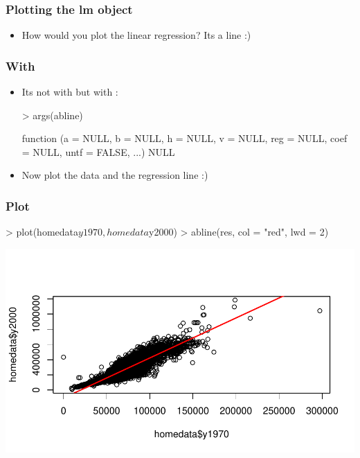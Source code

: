 \begin{frame}[allowframebreaks]
  \frametitle{Plotting the lm object}
  \begin{itemize}
  \item How would you plot the linear regression? Its a line :)
  \end{itemize}
\end{frame}

\begin{frame}
  \frametitle{With }
  \begin{itemize}
  \item Its not with  but with : \scriptsize
\begin{Schunk}
\begin{Sinput}
> args(abline)
\end{Sinput}
\begin{Soutput}
function (a = NULL, b = NULL, h = NULL, v = NULL, reg = NULL, 
    coef = NULL, untf = FALSE, ...) 
NULL
\end{Soutput}
\end{Schunk}
  \item \normalsize Now plot the data and the regression line :)
  \end{itemize}
\end{frame}

\begin{frame}
  \frametitle{Plot}
\begin{Schunk}
\begin{Sinput}
> plot(homedata$y1970, homedata$y2000)
> abline(res, col = "red", lwd = 2)
\end{Sinput}
\end{Schunk}
\includegraphics{plots/fig-005}
\end{frame}

